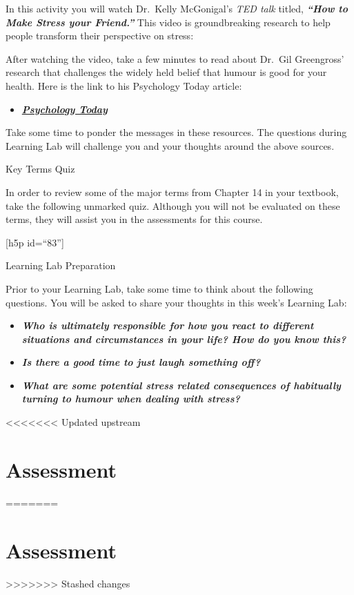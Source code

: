 \documentclass[
]{book}
\providecommand{\tightlist}{%
  \setlength{\itemsep}{0pt}\setlength{\parskip}{0pt}}
\begin{document}
\begin{reflect}
In this activity you will watch Dr.~Kelly McGonigal's \emph{TED talk} titled, \textbf{\emph{``How to Make Stress your Friend.''}} This video is groundbreaking research to help people transform their perspective on stress:

After watching the video, take a few minutes to read about Dr.~Gil Greengross' research that challenges the widely held belief that humour is good for your health. Here is the link to his Psychology Today article:

\begin{itemize}
\tightlist
\item
  \href{https://www.psychologytoday.com/intl/blog/humor-sapiens/201805/humor-may-not-be-so-good-your-health}{\textbf{\emph{Psychology Today}}}
\end{itemize}

Take some time to ponder the messages in these resources. The questions during Learning Lab will challenge you and your thoughts around the above sources.

{Key Terms Quiz}

In order to review some of the major terms from Chapter 14 in your textbook, take the following unmarked quiz. Although you will not be evaluated on these terms, they will assist you in the assessments for this course.

{[}h5p id=``83''{]}

{Learning Lab Preparation}

Prior to your Learning Lab, take some time to think about the following questions. You will be asked to share your thoughts in this week's Learning Lab:

\begin{itemize}
\tightlist
\item
  \textbf{\emph{Who is ultimately responsible for how you react to different situations and circumstances in your life? How do you know this?}}\\
\item
  \textbf{\emph{Is there a good time to just laugh something off?}}\\
\item
  \textbf{\emph{What are some potential stress related consequences of habitually turning to humour when dealing with stress?}}
\end{itemize}
\end{reflect}

<<<<<<< Updated upstream
\hypertarget{assessment-8}{%
\section*{Assessment}\label{assessment-8}}
=======
\hypertarget{assessment-7}{%
\section*{Assessment}\label{assessment-7}}
>>>>>>> Stashed changes
\end{document}
